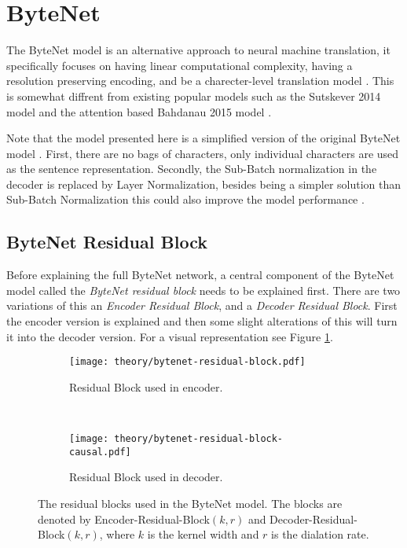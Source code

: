 \section{ByteNet}
\label{sec:theory:bytenet}

The ByteNet model is an alternative approach to neural machine translation, it specifically focuses on having linear computational complexity, having a resolution preserving encoding, and be a charecter-level translation model \cite{bytenet}. This is somewhat diffrent from existing popular models such as the Sutskever 2014 model \cite{sutskever-2014-nmt} and the attention based Bahdanau 2015 model \cite{bahdanau-2015-nmt}.

Note that the model presented here is a simplified version of the original ByteNet model \cite{bytenet}. First, there are no bags of characters, only individual characters are used as the sentence representation. Secondly, the Sub-Batch normalization in the decoder is replaced by Layer Normalization, besides being a simpler solution than Sub-Batch Normalization this could also improve the model performance \cite{layer-normalization}.

\subsection{ByteNet Residual Block}

Before explaining the full ByteNet network, a central component of the ByteNet model called the \textit{ByteNet residual block} needs to be explained first. There are two variations of this an \textit{Encoder Residual Block}, and a \textit{Decoder Residual Block}. First the encoder version is explained and then some slight alterations of this will turn it into the decoder version. For a visual representation see Figure \ref{fig:bytenet:residual-block}.

\begin{figure}[h]
    \centering
    \begin{subfigure}[b]{0.45\textwidth}
        \centering
        \texttt{[image: theory/bytenet-residual-block.pdf]}
        \caption{Residual Block used in encoder.}
    \end{subfigure}
    ~ %
    \begin{subfigure}[b]{0.45\textwidth}
        \centering
        \texttt{[image: theory/bytenet-residual-block-causal.pdf]}
        \caption{Residual Block used in decoder.}
    \end{subfigure}
    \caption{The residual blocks used in the ByteNet model. The blocks are denoted by Encoder-Residual-Block$(k,r)$ and Decoder-Residual-Block$(k,r)$, where $k$ is the kernel width and $r$ is the dialation rate.}
    \label{fig:bytenet:residual-block}
\end{figure}

